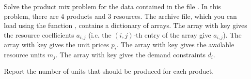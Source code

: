 \begin{problem}
Solve the product mix problem for the data contained in the file . In this problem, there are 4 products and 3 resources.
The archive file, which you can load using the function
, contains a dictionary of arrays. The array with key  gives the resource coefficients $a_{i,j}$ (i.e. the $(i,j)$-th entry
of the array give $a_{i,j}$). The array with key  gives the unit prices $p_i$. The array with key  gives the available resource
units $m_j$. The array with key  gives the demand constraints $d_i$.

Report the number of units that should be produced for each product.
\end{problem}
%
%
%
%

